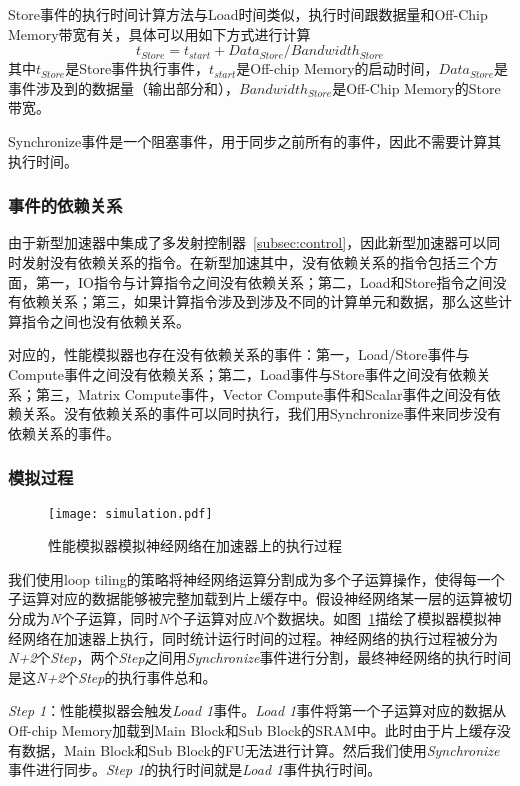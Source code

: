 Store事件的执行时间计算方法与Load时间类似，执行时间跟数据量和Off-Chip Memory带宽有关，具体可以用如下方式进行计算
\begin{equation}
t_{Store} = t_{start} + Data_{Store} / Bandwidth_{Store}
\end{equation}
其中$t_{Store}$是Store事件执行事件，$t_{start}$是Off-chip Memory的启动时间，$Data_{Store}$是事件涉及到的数据量（输出部分和），$Bandwidth_{Store}$是Off-Chip Memory的Store带宽。

Synchronize事件是一个阻塞事件，用于同步之前所有的事件，因此不需要计算其执行时间。


\subsubsection{事件的依赖关系}
由于新型加速器中集成了多发射控制器~\ref{subsec:control}，因此新型加速器可以同时发射没有依赖关系的指令。在新型加速其中，没有依赖关系的指令包括三个方面，第一，IO指令与计算指令之间没有依赖关系；第二，Load和Store指令之间没有依赖关系；第三，如果计算指令涉及到涉及不同的计算单元和数据，那么这些计算指令之间也没有依赖关系。

对应的，性能模拟器也存在没有依赖关系的事件：第一，Load/Store事件与Compute事件之间没有依赖关系；第二，Load事件与Store事件之间没有依赖关系；第三，Matrix Compute事件，Vector Compute事件和Scalar事件之间没有依赖关系。没有依赖关系的事件可以同时执行，我们用Synchronize事件来同步没有依赖关系的事件。

\subsubsection{模拟过程}

\begin{figure}[h]
\centering
\texttt{[image: simulation.pdf]}
\caption{性能模拟器模拟神经网络在加速器上的执行过程}
\label{fig:simulation}
\end{figure}

我们使用loop tiling的策略将神经网络运算分割成为多个子运算操作，使得每一个子运算对应的数据能够被完整加载到片上缓存中。假设神经网络某一层的运算被切分成为\emph{N}个子运算，同时\emph{N}个子运算对应\emph{N}个数据块。如图~\ref{fig:simulation}描绘了模拟器模拟神经网络在加速器上执行，同时统计运行时间的过程。神经网络的执行过程被分为\emph{N+2}个\emph{Step}，两个\emph{Step}之间用\emph{Synchronize}事件进行分割，最终神经网络的执行时间是这\emph{N+2}个\emph{Step}的执行事件总和。

\emph{Step 1}：性能模拟器会触发\emph{Load 1}事件。\emph{Load 1}事件将第一个子运算对应的数据从Off-chip Memory加载到Main Block和Sub Block的SRAM中。此时由于片上缓存没有数据，Main Block和Sub Block的FU无法进行计算。然后我们使用\emph{Synchronize}事件进行同步。\emph{Step 1}的执行时间就是\emph{Load 1}事件执行时间。

